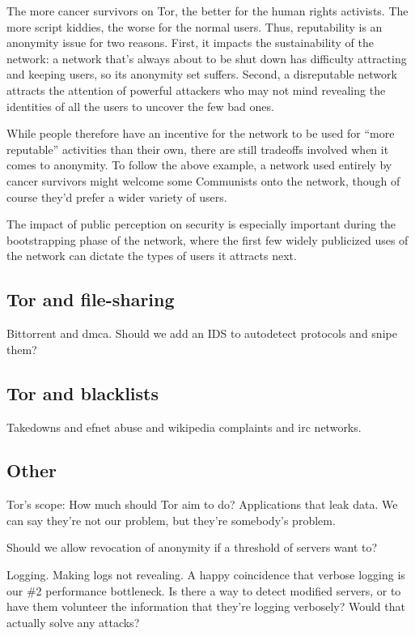 \documentclass{llncs}
\begin{document}
The more cancer survivors on Tor, the better for the human rights
activists. The more script kiddies, the worse for the normal users. Thus,
reputability is an anonymity issue for two reasons. First, it impacts
the sustainability of the network: a network that's always about to be
shut down has difficulty attracting and keeping users, so its anonymity
set suffers. Second, a disreputable network attracts the attention of
powerful attackers who may not mind revealing the identities of all the
users to uncover the few bad ones.

While people therefore have an incentive for the network to be used for
``more reputable'' activities than their own, there are still tradeoffs
involved when it comes to anonymity. To follow the above example, a
network used entirely by cancer survivors might welcome some Communists
onto the network, though of course they'd prefer a wider variety of users.

The impact of public perception on security is especially important
during the bootstrapping phase of the network, where the first few
widely publicized uses of the network can dictate the types of users it
attracts next.

\subsection{Tor and file-sharing}

Bittorrent and dmca. Should we add an IDS to autodetect protocols and
snipe them?

\subsection{Tor and blacklists}

Takedowns and efnet abuse and wikipedia complaints and irc
networks.

\subsection{Other}

Tor's scope: How much should Tor aim to do? Applications that leak
data. We can say they're not our problem, but they're somebody's problem.

Should we allow revocation of anonymity if a threshold of
servers want to?

Logging. Making logs not revealing. A happy coincidence that verbose
logging is our \#2 performance bottleneck. Is there a way to detect
modified servers, or to have them volunteer the information that they're
logging verbosely? Would that actually solve any attacks?
\end{document}
